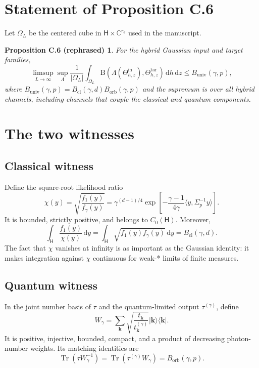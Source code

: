 \documentclass[11pt]{article}
\newcommand{\Hc}{\mathsf H}
\newcommand{\Tr}{\operatorname{Tr}}
\newcommand{\dd}{\,\mathrm d}
\newcommand{\B}{\mathrm B}
\newcommand{\Bcl}{B_{\mathrm{cl}}}
\newcommand{\Borb}{B_{\mathrm{orb}}}
\newcommand{\Buniv}{B_{\mathrm{univ}}}
\newtheorem*{propC}{Proposition C.6 (rephrased)}
\begin{document}
\section{Statement of Proposition C.6}

Let $\Omega_L$ be the centered cube in
$\Hc\times\mathbb C^{r_d}$ used in the manuscript.

\begin{propC}
For the hybrid Gaussian input and target families,
\[
  \limsup_{L\to\infty}\sup_\Lambda
  \frac1{|\Omega_L|}\int_{\Omega_L}
  \B\!\left(\Lambda(\Theta_{h,z}^{\mathrm{in}}),
  \Theta_{h,z}^{\mathrm{tar}}\right)\dd h\dd z
  \leq\Buniv(\gamma,p),
\]
where
$\Buniv(\gamma,p)=\Bcl(\gamma,d)\Borb(\gamma,p)$ and the supremum is over
all hybrid channels, including channels that couple the classical and
quantum components.
\end{propC}

\section{The two witnesses}

\subsection{Classical witness}

Define the square-root likelihood ratio
\begin{equation}\label{eq:chi}
  \chi(y)=\sqrt{\frac{f_1(y)}{f_\gamma(y)}}
  =\gamma^{(d-1)/4}
  \exp\!\left[-\frac{\gamma-1}{4\gamma}
  \langle y,\Sigma_p^{-1}y\rangle\right].
\end{equation}
It is bounded, strictly positive, and belongs to $C_0(\Hc)$.  Moreover,
\begin{equation}\label{eq:classical-id}
  \int_{\Hc}\frac{f_1(y)}{\chi(y)}\dd y
  =\int_{\Hc}\sqrt{f_1(y)f_\gamma(y)}\dd y
  =\Bcl(\gamma,d).
\end{equation}
The fact that $\chi$ vanishes at infinity is as important as the Gaussian
identity: it makes integration against $\chi$ continuous for weak-* limits
of finite measures.

\subsection{Quantum witness}

In the joint number basis of $\tau$ and the quantum-limited output
$\tau^{(\gamma)}$, define
\begin{equation}\label{eq:W}
  W_\gamma
  =\sum_{\mathbf k}
  \sqrt{\frac{t_{\mathbf k}}{t_{\mathbf k}^{(\gamma)}}}
  |\mathbf k\rangle\!\langle\mathbf k|.
\end{equation}
It is positive, injective, bounded, compact, and a product of decreasing
photon-number weights.  Its matching identities are
\begin{equation}\label{eq:quantum-id}
  \Tr(\tau W_\gamma^{-1})
  =\Tr(\tau^{(\gamma)}W_\gamma)
  =\Borb(\gamma,p).
\end{equation}
\end{document}
